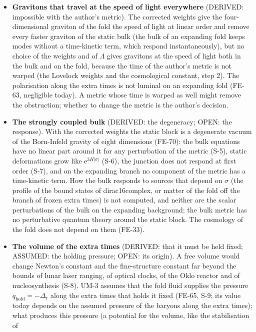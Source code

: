\documentclass[
  10pt,
]{article}
\providecommand{\tightlist}{%
  \setlength{\itemsep}{0pt}\setlength{\parskip}{0pt}}
\begin{document}
\begin{itemize}
\tightlist
\item
  \textbf{Gravitons that travel at the speed of light everywhere}
  (DERIVED: impossible with the author's metric). The corrected weights
  give the four-dimensional graviton of the fold the speed of light at
  linear order and remove every faster graviton of the static bulk (the
  bulk of an expanding fold keeps modes without a time-kinetic term,
  which respond instantaneously), but no choice of the weights and of
  \(\Lambda\) gives gravitons at the speed of light both in the bulk and
  on the fold, because the time of the author's metric is not warped
  (the Lovelock weights and the cosmological constant, step 2). The
  polarisation along the extra times is not luminal on an expanding fold
  (FE-63, negligible today). A metric whose time is warped as well might
  remove the obstruction; whether to change the metric is the author's
  decision.
\item
  \textbf{The strongly coupled bulk} (DERIVED: the degeneracy; OPEN: the
  response). With the corrected weights the static block is a degenerate
  vacuum of the Born-Infeld gravity of eight dimensions (FE-70): the
  bulk equations have no linear part around it for any perturbation of
  the metric (S-5), static deformations grow like
  \(\mathrm{e}^{3H\lvert\sigma\rvert}\) (S-6), the junction does not
  respond at first order (S-7), and on the expanding branch no component
  of the metric has a time-kinetic term. How the bulk responds to
  sources that depend on \(\sigma\) (the profile of the bound states of
  dirac16complex, or matter of the fold off the branch of frozen extra
  times) is not computed, and neither are the scalar perturbations of
  the bulk on the expanding background; the bulk metric has no
  perturbative quantum theory around the static block. The cosmology of
  the fold does not depend on them (FE-33).
\item
  \textbf{The volume of the extra times} (DERIVED: that it must be held
  fixed; ASSUMED: the holding pressure; OPEN: its origin). A free volume
  would change Newton's constant and the fine-structure constant far
  beyond the bounds of lunar laser ranging, of optical clocks, of the
  Oklo reactor and of nucleosynthesis (S-8). UM-3 assumes that the fold
  fluid supplies the pressure
  \(q_{\mathrm{hold}} = -\Delta_{\mathrm{r}}\) along the extra times
  that holds it fixed (FE-65, S-9; its value today depends on the
  assumed pressure of the baryons along the extra times); what produces
  this pressure (a potential for the volume, like the stabilisation of

\end{itemize}
\end{document}
